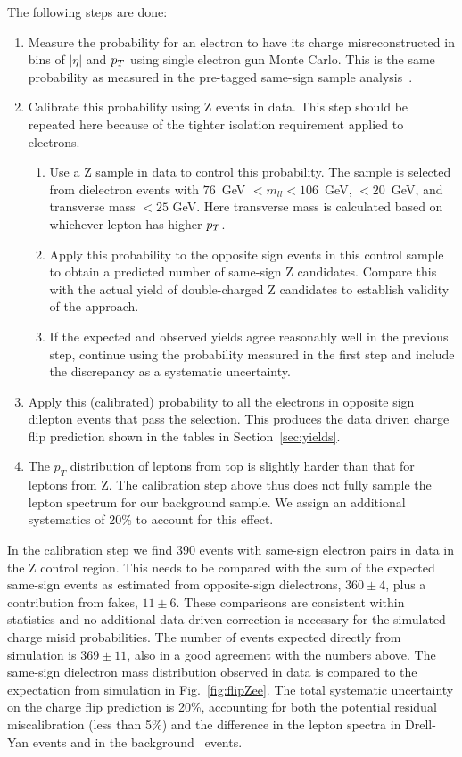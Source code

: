 The following steps are done:
\begin{enumerate}
	\item Measure the probability for an electron to have its charge misreconstructed 
		in bins of $|\eta |$ and $p_T$ using single electron gun Monte Carlo.
		This is the same probability as measured in the pre-tagged same-sign sample analysis~\cite{ssnote2011}.
	\item Calibrate this probability using Z events in data. 
		This step should be repeated here because of the tighter isolation requirement applied to electrons.
	\begin{enumerate}
		\item Use a Z sample in data to control this probability.
			The sample is selected from dielectron events with $76$\ GeV $ < m_{ll} < 106$\ GeV,  
			\met $ < 20$\ GeV, and transverse mass $< 25$ GeV.
			Here transverse mass is calculated based on whichever lepton has higher $p_T$. 
		\item Apply this probability to the opposite sign events in this control sample
			to obtain a predicted number of same-sign Z candidates.
			Compare this with the actual yield of double-charged Z candidates
			to establish validity of the approach.
		\item If the expected and observed yields agree reasonably well in the previous step, continue using
			the probability measured in the first step and include the discrepancy as a systematic uncertainty.
	\end{enumerate}
	\item Apply this (calibrated) probability to all the electrons in opposite sign dilepton events that pass the selection. 
		This produces the data driven charge flip  prediction shown in the tables in Section~\ref{sec:yields}. 
	\item The $p_T$ distribution of leptons from top is slightly harder than that for leptons from Z. 
		The calibration step above thus does not fully sample the lepton spectrum for our background sample. 
		We assign an additional systematics of 20\% to account for this effect.
\end{enumerate}

In the calibration step we find 390 events with same-sign electron pairs in data in the Z control region.
This needs to be compared with the sum of the expected same-sign events as estimated from
opposite-sign dielectrons, $360\pm4$, plus a contribution from fakes, $11\pm 6$.
These comparisons are consistent within statistics and no additional data-driven correction
is necessary for the simulated charge misid probabilities.
The number of events expected directly from simulation is  $369\pm 11$, also in a good agreement with the numbers above.
The same-sign dielectron mass distribution observed in data is compared to the expectation from
simulation in Fig.~\ref{fig:flipZee}.
The total systematic uncertainty on the charge flip prediction is 20\%,
accounting for both the potential residual miscalibration (less than 5\%) and the difference in the lepton
spectra in Drell-Yan events and in the background \ttbar\ events.


